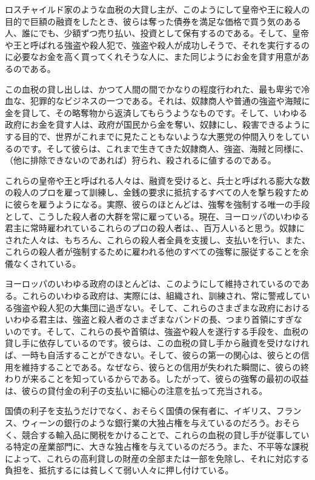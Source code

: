 \documentclass[dvipdfmx, uplatex, tate, landscape]{utbook}
\begin{document}
ロスチャイルド家のような血税の大貸し主が、このようにして皇帝や王に殺人の目的で巨額の融資をしたとき、彼らは奪った債券を満足な価格で買う気のある人、誰にでも、少額ずつ売り払い、投資として保有するのである。そして、皇帝や王と呼ばれる強盗や殺人犯で、強盗や殺人が成功しそうで、それを実行するのに必要なお金を高く買ってくれそうな人に、また同じようにお金を貸す用意があるのである。

この血税の貸し出しは、かつて人間の間でかなりの程度行われた、最も卑劣で冷血な、犯罪的なビジネスの一つである。それは、奴隷商人や普通の強盗や海賊に金を貸して、その略奪物から返済してもらうようなものです。そして、いわゆる政府にお金を貸す人は、政府が国民から金を奪い、奴隷にし、殺害できるようにする目的で、世界がこれまでに見たこともないような大悪党の仲間入りをしているのです。そして彼らは、これまで生きてきた奴隷商人、強盗、海賊と同様に、（他に排除できないのであれば）狩られ、殺されるに値するのである。

これらの皇帝や王と呼ばれる人々は、融資を受けると、兵士と呼ばれる膨大な数の殺人のプロを雇って訓練し、金銭の要求に抵抗するすべての人を撃ち殺すために彼らを雇うようになる。実際、彼らのほとんどは、強奪を強制する唯一の手段として、こうした殺人者の大群を常に雇っている。現在、ヨーロッパのいわゆる君主に常時雇われているこれらのプロの殺人者は、、百万人いると思う。奴隷にされた人々は、もちろん、これらの殺人者全員を支援し、支払いを行い、また、これらの殺人者が強制するために雇われる他のすべての強奪に服従することを余儀なくされている。

ヨーロッパのいわゆる政府のほとんどは、このようにして維持されているのである。これらのいわゆる政府は、実際には、組織され、訓練され、常に警戒している強盗や殺人犯の大集団に過ぎない。そして、これらのさまざまな政府におけるいわゆる君主は、強盗と殺人者のさまざまなバンドの長、つまり首領にすぎないのです。そして、これらの長や首領は、強盗や殺人を遂行する手段を、血税の貸し手に依存しているのです。彼らは、この血税の貸し手から融資を受けなければ、一時も自活することができない。そして、彼らの第一の関心は、彼らとの信用を維持することである。なぜなら、彼らとの信用が失われた瞬間に、彼らの終わりが来ることを知っているからである。したがって、彼らの強奪の最初の収益は、彼らの貸付金の利子の支払いに細心の注意を払って充当される。

国債の利子を支払うだけでなく、おそらく国債の保有者に、イギリス、フランス、ウィーンの銀行のような銀行業の大独占権を与えているのだろう。おそらく、競合する輸入品に関税をかけることで、これらの血税の貸し手が従事している特定の産業部門に、大きな独占権を与えているのだろう。また、不平等な課税によって、これらの高利貸しの財産の全部または一部を免除し、それに対応する負担を、抵抗するには貧しくて弱い人々に押し付けている。
\end{document}
